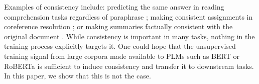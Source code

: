 Examples of consistency include: predicting the same answer in reading comprehension tasks regardless of paraphrase \cite{consistent-qa}; making consistent assignments in coreference resolution \cite{denis2009global,chang2011inference}; or making summaries factually consistent with  the original document \cite{kryscinski2020evaluating}.
While consistency is important in many tasks, nothing in the
training process explicitly targets it. One could hope that
the unsupervised training signal from large corpora
made available to PLMs such as BERT or RoBERTa
\cite{bert,roberta} is sufficient to induce consistency and
transfer it to downstream tasks.
In this paper, we show that this is not the case.


